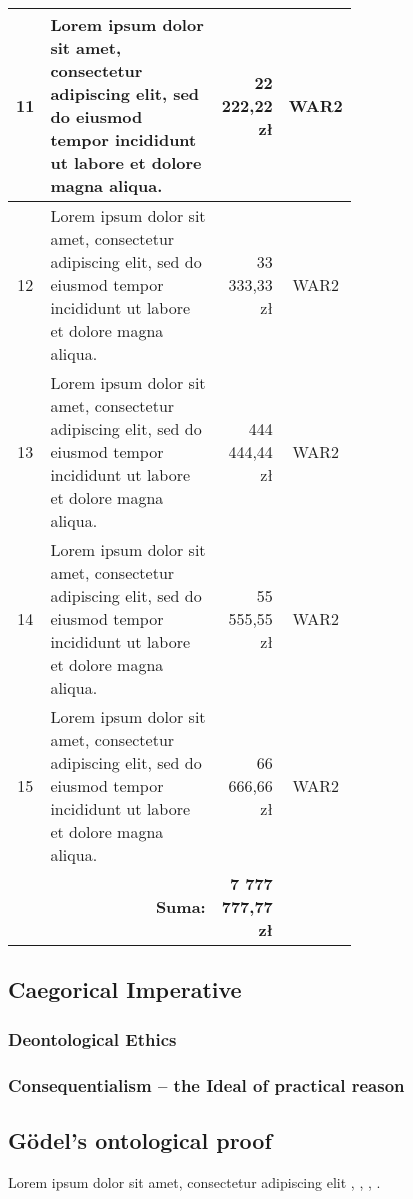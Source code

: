 \begin{longtable}{| c | m{0.58\linewidth} | r | m{0.1\linewidth} |}
    11 & Lorem ipsum dolor sit amet, consectetur adipiscing elit, sed do eiusmod tempor incididunt ut labore et dolore magna aliqua. & 22 222,22 zł               & \multicolumn{1}{c|}{WAR2}                          \\ \hline
    12 & Lorem ipsum dolor sit amet, consectetur adipiscing elit, sed do eiusmod tempor incididunt ut labore et dolore magna aliqua. & 33 333,33 zł               & \multicolumn{1}{c|}{WAR2}                          \\ \hline
    13 & Lorem ipsum dolor sit amet, consectetur adipiscing elit, sed do eiusmod tempor incididunt ut labore et dolore magna aliqua. & 444 444,44 zł              & \multicolumn{1}{c|}{WAR2}                          \\ \hline
    14 & Lorem ipsum dolor sit amet, consectetur adipiscing elit, sed do eiusmod tempor incididunt ut labore et dolore magna aliqua. & 55 555,55 zł               & \multicolumn{1}{c|}{WAR2}                          \\ \hline
    15 & Lorem ipsum dolor sit amet, consectetur adipiscing elit, sed do eiusmod tempor incididunt ut labore et dolore magna aliqua. & 66 666,66 zł               & \multicolumn{1}{c|}{WAR2}                          \\ \hline
       & \multicolumn{1}{r|}{\textbf{Suma:}}                                                                                         & \textbf{7 777 777,77 zł}   &
\end{longtable}

\kant[2]

\subsection{Caegorical Imperative} %
\subsubsection{Deontological Ethics} %
\kant[2]
\subsubsection{Consequentialism -- the Ideal of practical reason} %
\kant[3]
\subsection{G\"odel's ontological proof} %
\kant[9] Lorem ipsum dolor sit amet, consectetur adipiscing elit \cite{benzmuller2014}, \cite{goedel95}, \cite{wang97}, \cite{koons2005}.

